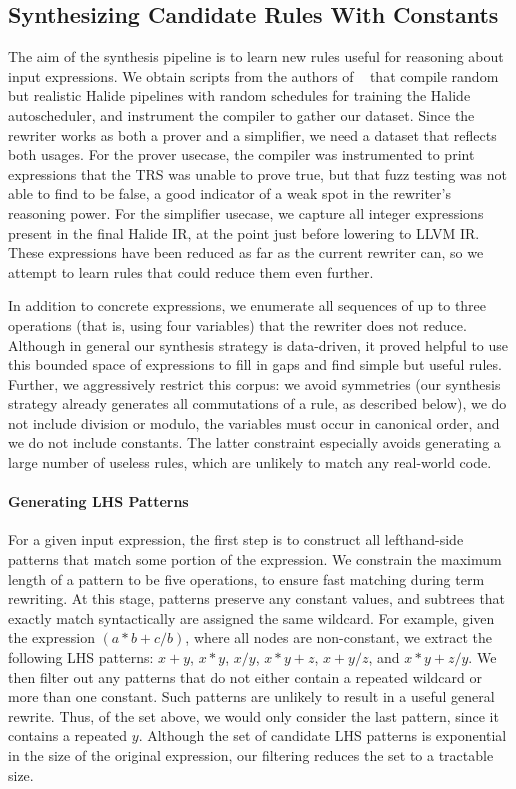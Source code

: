 \documentclass[sigplan,10pt,review,anonymous]{acmart}\settopmatter{printfolios=true,printccs=false,printacmref=false}
\begin{document}
\subsection{Synthesizing Candidate Rules With Constants}
The aim of the synthesis pipeline is to learn new rules useful for reasoning about input expressions.
We obtain scripts from the authors of \citeauthor{Adams2019}~\cite{Adams2019} that compile
 random but realistic Halide pipelines with random schedules for
training the Halide autoscheduler, and instrument the compiler to gather our dataset.
Since the rewriter works as both a prover and a simplifier, we need a dataset that reflects both usages.
For the prover usecase,  the compiler was instrumented to print
expressions that the TRS was unable to prove true, but that fuzz
testing was not able to find to be false, a good indicator of a weak spot in the
rewriter's reasoning power. For the simplifier usecase, we capture all
integer expressions present in the final Halide IR, at the point just before 
lowering to LLVM IR. These expressions have been reduced as far as the current rewriter can, so we attempt
to learn rules that could reduce them even further. 

In addition to concrete expressions, we enumerate all sequences of up to three operations (that is,
using four variables) that the rewriter does not reduce. Although in general our synthesis strategy is data-driven,
it proved helpful to use this bounded space of expressions to fill in gaps and find simple but useful rules.
  Further, we aggressively restrict
this corpus: we avoid symmetries (our synthesis strategy already generates all commutations
of a rule, as described below), we do not include division or modulo, the variables must occur
in canonical order, and we do not include constants. The latter constraint
especially avoids generating a large number of useless rules, which are unlikely to
match any real-world code. 

\paragraph{Generating LHS Patterns} For a given input expression, the first step
is to construct all lefthand-side patterns that match some portion of the expression.
We constrain the maximum length of a pattern to be five operations, to ensure fast matching
during term rewriting. At this stage, patterns preserve any constant values, and subtrees
that exactly match syntactically are assigned the same wildcard. For
example, given the expression $(a*b + c/b)$, where all nodes are non-constant,
we extract the following LHS patterns: $x + y$, $x * y$, $x / y$, $x * y + z$,
$x + y/z$, and $x*y + z/y$.  We then filter out any patterns that do not either contain
a repeated wildcard or more than one constant. Such patterns are unlikely to result in a useful general
rewrite.  Thus, of the set above, we would only consider the last pattern, since
it contains a repeated $y$.  Although the set of candidate LHS patterns is exponential
in the size of the original expression, our filtering reduces the set to a tractable
size.
\end{document}
